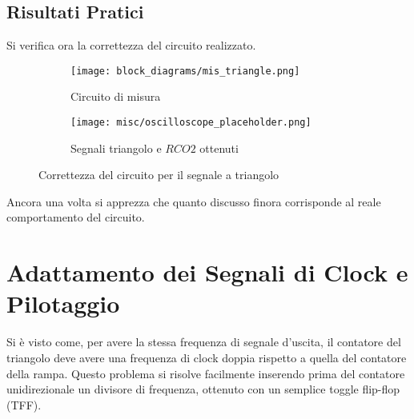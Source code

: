 
\subsection*{Risultati Pratici}


Si verifica ora la correttezza del circuito realizzato.

\begin{figure}[H]
    \centering

    \begin{subfigure}{.5\textwidth}
        \centering
        \texttt{[image: block\_diagrams/mis\_triangle.png]}
        \caption{Circuito di misura}
        \label{mis_triangle}
    \end{subfigure}%
    \begin{subfigure}{.5\textwidth}
        \centering
        \texttt{[image: misc/oscilloscope\_placeholder.png]}
        \caption{Segnali triangolo e $RCO2$ ottenuti}
        \label{acq_triangle}
    \end{subfigure}

    \caption{Correttezza del circuito per il segnale a triangolo}
    \label{acq_triangle_signals}
\end{figure}

Ancora una volta si apprezza che quanto discusso finora corrisponde al reale comportamento
del circuito.


\section{Adattamento dei Segnali di Clock e Pilotaggio}


Si è visto come, per avere la stessa frequenza di segnale d'uscita, il contatore del
triangolo deve avere una frequenza di clock doppia rispetto a quella del contatore della
rampa. Questo problema si risolve facilmente inserendo prima del contatore unidirezionale
un divisore di frequenza, ottenuto con un semplice toggle flip-flop (TFF).

